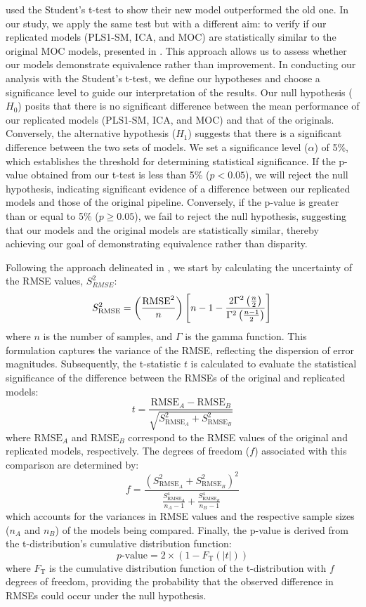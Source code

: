 \citet{andersonImprovedAccuracyQuantitative2017} used the Student's t-test to show their new model outperformed the old one. In our study, we apply the same test but with a different aim: to verify if our replicated models (PLS1-SM, ICA, and MOC) are statistically similar to the original MOC  models, presented in \citet{cleggRecalibrationMarsScience2017}. This approach allows us to assess whether our models demonstrate equivalence rather than improvement.
In conducting our analysis with the Student's t-test, we define our hypotheses and choose a significance level to guide our interpretation of the results.
Our null hypothesis (\(H_0\)) posits that there is no significant difference between the mean performance of our replicated models (PLS1-SM, ICA, and MOC) and that of the originals.
Conversely, the alternative hypothesis (\(H_1\)) suggests that there is a significant difference between the two sets of models.
We set a significance level (\(\alpha\)) of 5\%, which establishes the threshold for determining statistical significance.
If the p-value obtained from our t-test is less than 5\% (\(p < 0.05\)), we will reject the null hypothesis, indicating significant evidence of a difference between our replicated models and those of the original pipeline.
Conversely, if the p-value is greater than or equal to 5\% (\(p \geq 0.05\)), we fail to reject the null hypothesis, suggesting that our models and the original models are statistically similar, thereby achieving our goal of demonstrating equivalence rather than disparity.

Following the approach delineated in \citet{andersonImprovedAccuracyQuantitative2017}, we start by calculating the uncertainty of the RMSE values, $S_{RMSE}^2$:
$$
S_{\text{RMSE}}^2 = \left(\frac{\text{RMSE}^2}{n}\right) \left[n - 1 - \frac{2\Gamma^2\left(\frac{n}{2}\right)}{\Gamma^2\left(\frac{n - 1}{2}\right)}\right] \\
$$
where $n$ is the number of samples, and $\Gamma$ is the gamma function. This formulation captures the variance of the RMSE, reflecting the dispersion of error magnitudes.
Subsequently, the t-statistic $t$ is calculated to evaluate the statistical significance of the difference between the RMSEs of the original and replicated models:
$$
t = \frac{\text{RMSE}_A - \text{RMSE}_B}{\sqrt{S_{\text{RMSE}_A}^2 + S_{\text{RMSE}_B}^2}}
$$
where $\text{RMSE}_A$ and $\text{RMSE}_B$ correspond to the RMSE values of the original and replicated models, respectively.
The degrees of freedom ($f$) associated with this comparison are determined by:
$$
f = \frac{\left(S_{\text{RMSE}_A}^2 + S_{\text{RMSE}_B}^2\right)^2}{\frac{S^4_{\text{RMSE}_A}}{n_A - 1} + \frac{S^4_{\text{RMSE}_B}}{n_B - 1}}
$$
which accounts for the variances in RMSE values and the respective sample sizes ($n_A$ and $n_B$) of the models being compared.
Finally, the p-value is derived from the t-distribution's cumulative distribution function:
$$p\text{-value} = 2 \times \left(1 - F_{\text{T}}(|t|)\right)$$
where $F_{\text{T}}$ is the cumulative distribution function of the t-distribution with $f$ degrees of freedom, providing the probability that the observed difference in RMSEs could occur under the null hypothesis.

